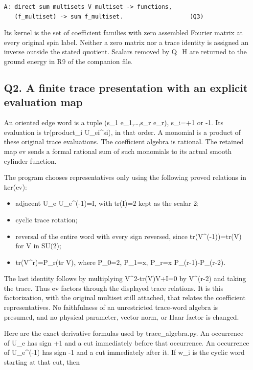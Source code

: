 \documentclass[11pt,a4paper]{article}
\providecommand{\tightlist}{\setlength{\itemsep}{0pt}\setlength{\parskip}{0pt}}
\renewcommand{\[}{\begingroup\small\originaldisplaystart}
\renewcommand{\]}{\originaldisplayend\endgroup}
\begin{document}
\begin{verbatim}
A: direct_sum_multisets V_multiset -> functions,
   (f_multiset) -> sum f_multiset.                   (Q3)
\end{verbatim}

Its kernel is the set of coefficient families with zero assembled
Fourier matrix at every original spin label. Neither a zero matrix nor a
trace identity is assigned an inverse outside the stated quotient.
Scalars removed by Q\_H are returned to the ground energy in R9 of the
companion file.

\subsection{Q2. A finite trace presentation with an explicit evaluation
map}\label{q2.-a-finite-trace-presentation-with-an-explicit-evaluation-map}

An oriented edge word is a tuple (s\_1 e\_1,\ldots,s\_r e\_r), s\_i=+1
or -1. Its evaluation is tr(product\_i U\_ei\^{}si), in that order. A
monomial is a product of these original trace evaluations. The
coefficient algebra is rational. The retained map
{\ttfamily e\allowbreak{}v\allowbreak{}} sends a formal rational sum of
such monomials to its actual smooth cylinder function.

The program chooses representatives only using the following proved
relations in ker(ev):

\begin{itemize}
\tightlist
\item
  adjacent U\_e U\_e\^{}(-1)=I, with tr(I)=2 kept as the scalar 2;
\item
  cyclic trace rotation;
\item
  reversal of the entire word with every sign reversed, since
  tr(V\^{}(-1))=tr(V) for V in SU(2);
\item
  tr(V\^{}r)=P\_r(tr V), where P\_0=2, P\_1=x, P\_r=x P\_(r-1)-P\_(r-2).
\end{itemize}

The last identity follows by multiplying V\^{}2-tr(V)V+I=0 by V\^{}(r-2)
and taking the trace. Thus {\ttfamily e\allowbreak{}v\allowbreak{}}
factors through the displayed trace relations. It is this factorization,
with the original multiset still attached, that relates the coefficient
representatives. No faithfulness of an unrestricted trace-word algebra
is presumed, and no physical parameter, vector norm, or Haar factor is
changed.

Here are the exact derivative formulas used by
{\ttfamily t\allowbreak{}r\allowbreak{}a\allowbreak{}c\allowbreak{}e\allowbreak{}\_\allowbreak{}a\allowbreak{}l\allowbreak{}g\allowbreak{}e\allowbreak{}b\allowbreak{}r\allowbreak{}a\allowbreak{}.\allowbreak{}p\allowbreak{}y\allowbreak{}}.
An occurrence of U\_e has sign +1 and a cut immediately before that
occurrence. An occurrence of U\_e\^{}(-1) has sign -1 and a cut
immediately after it. If w\_i is the cyclic word starting at that cut,
then
\end{document}
